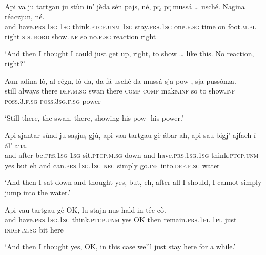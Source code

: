 \begin{linenumbers}
\gll  Api va ju tartgau ju stùn in’ jèda sén pajs, né, pr̩, pr̩ mussá … usché.\footnotemark{}  Nagina réaczjun, né.\\
and have.\textsc{prs.1sg} \textsc{1sg} think.\textsc{ptcp.unm} \textsc{1sg} stay.\textsc{prs.1sg} one.\textsc{f.sg} time on foot.\textsc{m.pl} right \textsc{s} \textsc{subord} show.\textsc{inf} {} so no.\textsc{f.sg} reaction right\\
\end{linenumbers}\medskip
\glt `And then I thought I could just get up, right, to show … like this. No reaction, right?'
\medskip

\begin{linenumbers}
\gll  Aun adina lò, al cégn, lò da, da fá usché da mussá sja pow-, sja pussònza.\\
still always there \textsc{def.m.sg} swan there \textsc{comp} \textsc{comp} make.\textsc{inf} so to show.\textsc{inf} \textsc{poss.3.f.sg} {} \textsc{poss.3sg.f.sg} power\\
\end{linenumbers}
\medskip
\glt `Still there, the swan, there, showing his pow- his power.'
\medskip

\begin{linenumbers}
\gll  Api sjantar sùnd ju saṣjuṣ gjù, api vau tartgau gè ábar ah, api sau bigj’ ajfach\footnotemark{} í ál’ aua.\\
and after be.\textsc{prs.1sg} \textsc{1sg} sit.\textsc{ptcp.m.sg} down and have.\textsc{prs.1sg.1sg} think.\textsc{ptcp.unm} yes but eh and can.\textsc{prs.1sg.1sg} \textsc{neg} simply go.\textsc{inf} into.\textsc{def.f.sg} water\\
\end{linenumbers}
\medskip
\glt `And then I sat down and thought yes, but, eh, after all I should, I cannot simply jump into the water.'
\medskip

\begin{linenumbers}
\gll  Api vau tartgau gè OK, lu stajn nus hald in téc cò.\\
and have.\textsc{prs.1sg.1sg} think.\textsc{ptcp.unm} yes OK then remain.\textsc{prs.1pl} \textsc{1pl} just \textsc{indef.m.sg} bit here\\
\end{linenumbers}
\medskip
\glt `And then I thought yes, OK, in this case we’ll just stay here for a while.'
\medskip

